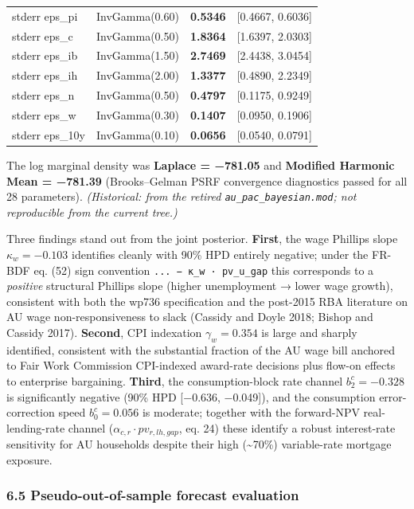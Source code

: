 \documentclass[
]{article}
\begin{document}
{\begin{longtable}[]{@{}llll@{}}
stderr eps\_pi & InvGamma(0.60) & \textbf{0.5346} & {[}0.4667,
0.6036{]} \\
stderr eps\_c & InvGamma(0.50) & \textbf{1.8364} & {[}1.6397,
2.0303{]} \\
stderr eps\_ib & InvGamma(1.50) & \textbf{2.7469} & {[}2.4438,
3.0454{]} \\
stderr eps\_ih & InvGamma(2.00) & \textbf{1.3377} & {[}0.4890,
2.2349{]} \\
stderr eps\_n & InvGamma(0.50) & \textbf{0.4797} & {[}0.1175,
0.9249{]} \\
stderr eps\_w & InvGamma(0.30) & \textbf{0.1407} & {[}0.0950,
0.1906{]} \\
stderr eps\_10y & InvGamma(0.10) & \textbf{0.0656} & {[}0.0540,
0.0791{]} \\
\end{longtable}
}

The log marginal density was \textbf{Laplace = −781.05} and
\textbf{Modified Harmonic Mean = −781.39} (Brooks--Gelman PSRF
convergence diagnostics passed for all 28 parameters).
\emph{(Historical: from the retired \texttt{au\_pac\_bayesian.mod}; not
reproducible from the current tree.)}

Three findings stand out from the joint posterior. \textbf{First}, the
wage Phillips slope \(\kappa_w = -0.103\) identifies cleanly with 90\%
HPD entirely negative; under the FR-BDF eq. (52) sign convention
\texttt{...\ −\ κ\_w\ ·\ pv\_u\_gap} this corresponds to a
\emph{positive} structural Phillips slope (higher unemployment → lower
wage growth), consistent with both the wp736 specification and the
post-2015 RBA literature on AU wage non-responsiveness to slack (Cassidy
and Doyle 2018; Bishop and Cassidy 2017). \textbf{Second}, CPI
indexation \(\gamma_w = 0.354\) is large and sharply identified,
consistent with the substantial fraction of the AU wage bill anchored to
Fair Work Commission CPI-indexed award-rate decisions plus flow-on
effects to enterprise bargaining. \textbf{Third}, the consumption-block
rate channel \(b^c_2 = -0.328\) is significantly negative (90\% HPD
{[}−0.636, −0.049{]}), and the consumption error-correction speed
\(b^c_0 = 0.056\) is moderate; together with the forward-NPV
real-lending-rate channel (\(\alpha_{c,r} \cdot pv_{r,lh,gap}\), eq. 24)
these identify a robust interest-rate sensitivity for AU households
despite their high (\textasciitilde70\%) variable-rate mortgage
exposure.

\subsubsection{6.5 Pseudo-out-of-sample forecast
evaluation}\label{pseudo-out-of-sample-forecast-evaluation}
\end{document}

